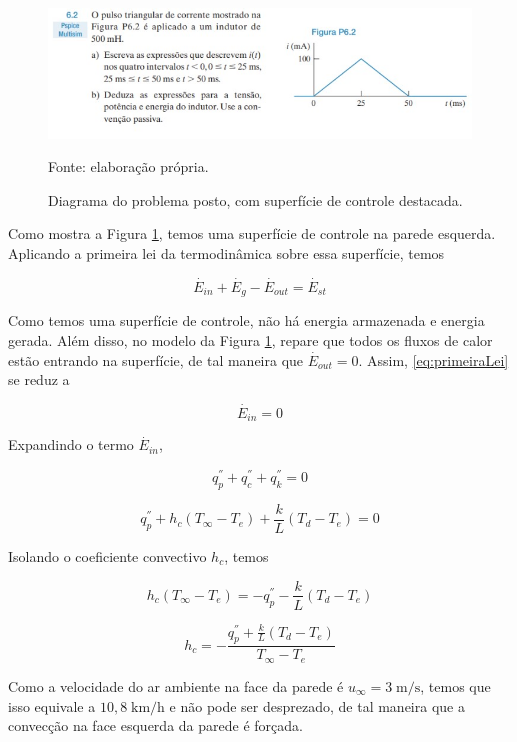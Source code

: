 \documentclass[12pt]{scrartcl}
\newcommand{\un}[1]{\;\textrm{#1}}
\begin{document}
\begin{figure}[h!]
    \caption{Diagrama do problema posto, com superfície de controle destacada.}
    \label{fig:problemaParede}
    \centering
    \includegraphics[scale=1.0]{problema.jpg}
    \par{Fonte: elaboração própria.}
\end{figure}

Como mostra a Figura \ref{fig:problemaParede}, temos uma superfície de controle na  
parede esquerda. Aplicando a primeira lei da termodinâmica sobre essa superfície, temos

\begin{equation}\label{eq:primeiraLei}
    \overset{\cdot}{E}_{in} + \overset{\cdot}{E}_{g} - \overset{\cdot}{E}_{out} = \overset{\cdot}{E}_{st}
\end{equation}

Como temos uma superfície de controle, não há energia armazenada e energia gerada. Além disso, no modelo
da Figura \ref*{fig:problemaParede}, repare que todos os fluxos de calor estão entrando na superfície, de tal  
maneira que $\overset{\cdot}{E}_{out} = 0$. Assim, \eqref{eq:primeiraLei} se reduz a 

\begin{equation}\label{eq:primeiraLeiReduzida}
    \overset{\cdot}{E}_{in} = 0
\end{equation}

Expandindo o termo $\overset{\cdot}{E}_{in}$, 

\[ q_{p}^{''} + q_{c}^{''} + q_{k}^{''} = 0 \]

\[ q_{p}^{''} + h_c\left(T_{\infty}-T_e\right) + \frac{k}{L}\left(T_d-T_e\right) = 0 \]

Isolando o coeficiente convectivo $h_c$, temos

\[ h_c\left(T_{\infty}-T_e\right) = - q_{p}^{''} - \frac{k}{L}\left(T_d-T_e\right)\]

\begin{equation}\label{eq:hc}
    h_c = - \frac{q_{p}^{''} + \frac{k}{L}\left(T_d-T_e\right)}{T_{\infty}-T_e}
\end{equation}

Como a velocidade do ar ambiente na face da parede é $u_{\infty}=3 \un{m/s}$, temos que isso equivale a 
$10,8 \un{km/h}$ e não pode ser desprezado, de tal maneira que a convecção na face esquerda da parede é forçada.
\end{document}
